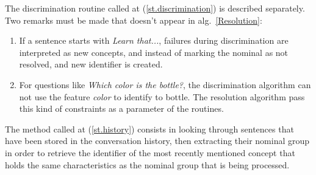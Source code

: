 \documentclass[a4paper]{article}
\begin{document}
The discrimination routine called at (\ref{st.discrimination}) is described separately. 
Two remarks must be made that doesn't appear in alg.~\ref{Resolution}:
\begin{enumerate}
    \item If a sentence starts with {\it Learn that...}, failures during 
    discrimination are interpreted as new concepts, and instead of marking the 
    nominal as not resolved, and new identifier is created.
    \item For questions like {\it Which color is the bottle?}, the discrimination 
    algorithm can not use the feature {\it color} to identify to bottle. The 
    resolution algorithm pass this kind of constraints as a parameter of the 
     routines.
\end{enumerate}

The method called at (\ref{st.history}) consists in looking through sentences that have been stored in the conversation history, then extracting their nominal group in order to retrieve the identifier of the most recently mentioned concept that holds the same characteristics as the nominal group that is being processed.
\end{document}
